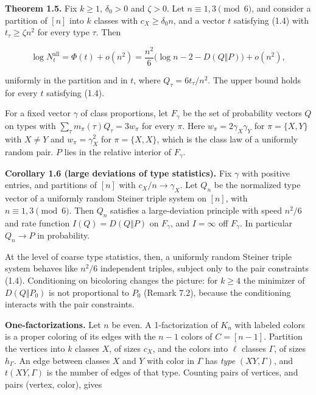 \documentclass[english,11pt,a4paper]{article}
\begin{document}
\textbf{Theorem 1.5.} Fix \(k\ge1\), \(\delta_0>0\) and \(\zeta>0\). Let \(n\equiv1,3\pmod 6\), and consider a partition of \([n]\) into \(k\) classes with \(c_X\ge\delta_0 n\), and a vector \(t\) satisfying (1.4) with \(t_\tau\ge\zeta n^2\) for every type \(\tau\). Then

\nopagebreak[4]
\[\log N^{\mathrm{all}}_t=\Phi(t)+o(n^2)=\frac{n^2}{6}\bigl(\log n-2-D(Q\Vert P)\bigr)+o(n^2),\]

uniformly in the partition and in \(t\), where \(Q_\tau=6t_\tau/n^2\). The upper bound holds for every \(t\) satisfying (1.4).

For a fixed vector \(\gamma\) of class proportions, let \(F_\gamma\) be the set of probability vectors \(Q\) on types with \(\sum_\tau m_\pi(\tau)Q_\tau=3w_\pi\) for every \(\pi\). Here \(w_\pi=2\gamma_X\gamma_Y\) for \(\pi=\{X,Y\}\) with \(X\ne Y\) and \(w_\pi=\gamma_X^2\) for \(\pi=\{X,X\}\), which is the class law of a uniformly random pair. \(P\) lies in the relative interior of \(F_\gamma\).

\textbf{Corollary 1.6 (large deviations of type statistics).} Fix \(\gamma\) with positive entries, and partitions of \([n]\) with \(c_X/n\to\gamma_X\). Let \(Q_n\) be the normalized type vector of a uniformly random Steiner triple system on \([n]\), with \(n\equiv1,3\pmod 6\). Then \(Q_n\) satisfies a large-deviation principle with speed \(n^2/6\) and rate function \(I(Q)=D(Q\Vert P)\) on \(F_\gamma\), and \(I=\infty\) off \(F_\gamma\). In particular \(Q_n\to P\) in probability.

At the level of coarse type statistics, then, a uniformly random Steiner triple system behaves like \(n^2/6\) independent triples, subject only to the pair constraints (1.4). Conditioning on bicoloring changes the picture: for \(k\ge4\) the minimizer of \(D(Q\Vert P_0)\) is not proportional to \(P_0\) (Remark 7.2), because the conditioning interacts with the pair constraints.

\textbf{One-factorizations.} Let \(n\) be even. A 1-factorization of \(K_n\) with labeled colors is a proper coloring of its edges with the \(n-1\) colors of \(C=[n-1]\). Partition the vertices into \(k\) classes \(X\), of sizes \(c_X\), and the colors into \(\ell\) classes \(\Gamma\), of sizes \(h_\Gamma\). An edge between classes \(X\) and \(Y\) with color in \(\Gamma\) has \emph{type} \((XY,\Gamma)\), and \(t(XY,\Gamma)\) is the number of edges of that type. Counting pairs of vertices, and pairs (vertex, color), gives
\end{document}
